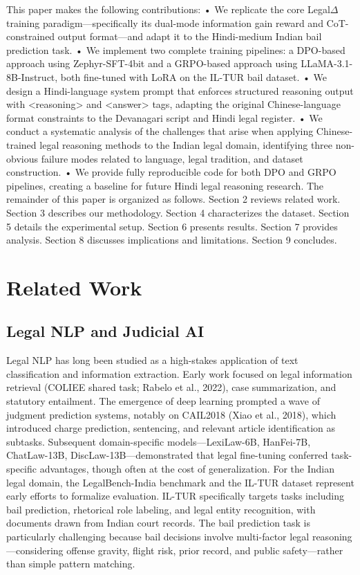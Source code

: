 \documentclass[conference]{IEEEtran}
\begin{document}
This paper makes the following contributions:
•	We replicate the core Legal$\Delta$ training paradigm—specifically its dual-mode information gain reward and CoT-constrained output format—and adapt it to the Hindi-medium Indian bail prediction task.
•	We implement two complete training pipelines: a DPO-based approach using Zephyr-SFT-4bit and a GRPO-based approach using LLaMA-3.1-8B-Instruct, both fine-tuned with LoRA on the IL-TUR bail dataset.
•	We design a Hindi-language system prompt that enforces structured reasoning output with <reasoning> and <answer> tags, adapting the original Chinese-language format constraints to the Devanagari script and Hindi legal register.
•	We conduct a systematic analysis of the challenges that arise when applying Chinese-trained legal reasoning methods to the Indian legal domain, identifying three non-obvious failure modes related to language, legal tradition, and dataset construction.
•	We provide fully reproducible code for both DPO and GRPO pipelines, creating a baseline for future Hindi legal reasoning research.
The remainder of this paper is organized as follows. Section 2 reviews related work. Section 3 describes our methodology. Section 4 characterizes the dataset. Section 5 details the experimental setup. Section 6 presents results. Section 7 provides analysis. Section 8 discusses implications and limitations. Section 9 concludes.
 

\section{Related Work}

\subsection{Legal NLP and Judicial AI}

Legal NLP has long been studied as a high-stakes application of text classification and information extraction. Early work focused on legal information retrieval (COLIEE shared task; Rabelo et al., 2022), case summarization, and statutory entailment. The emergence of deep learning prompted a wave of judgment prediction systems, notably on CAIL2018 (Xiao et al., 2018), which introduced charge prediction, sentencing, and relevant article identification as subtasks. Subsequent domain-specific models—LexiLaw-6B, HanFei-7B, ChatLaw-13B, DiscLaw-13B—demonstrated that legal fine-tuning conferred task-specific advantages, though often at the cost of generalization. For the Indian legal domain, the LegalBench-India benchmark and the IL-TUR dataset represent early efforts to formalize evaluation. IL-TUR specifically targets tasks including bail prediction, rhetorical role labeling, and legal entity recognition, with documents drawn from Indian court records. The bail prediction task is particularly challenging because bail decisions involve multi-factor legal reasoning—considering offense gravity, flight risk, prior record, and public safety—rather than simple pattern matching.
\end{document}
